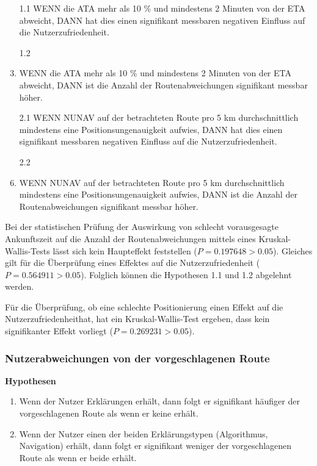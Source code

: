 \begin{enumerate}
    \item[1.1] WENN die ATA mehr als 10 \% und mindestens 2 Minuten von der ETA abweicht, DANN hat dies einen signifikant messbaren negativen Einfluss auf die Nutzerzufriedenheit.
    \item[1.2] \item WENN die ATA mehr als 10 \% und mindestens 2 Minuten von der ETA abweicht, DANN ist die Anzahl der Routenabweichungen signifikant messbar höher.
    \item[2.1] WENN NUNAV auf der betrachteten Route pro 5 km durchschnittlich mindestens eine Positionsungenauigkeit aufwies, DANN hat dies einen signifikant messbaren negativen Einfluss auf die Nutzerzufriedenheit.
    \item[2.2] \item WENN NUNAV auf der betrachteten Route pro 5 km durchschnittlich mindestens eine Positionsungenauigkeit aufwies, DANN ist die Anzahl der Routenabweichungen signifikant messbar höher.
\end{enumerate}

Bei der statistischen Prüfung der Auswirkung von schlecht vorausgesagte Ankunftszeit auf die Anzahl der Routenabweichungen mittels eines Kruskal-Wallis-Tests lässt sich kein Haupteffekt feststellen ($ P = 0.197648 > 0.05 $). Gleiches gilt für die Überprüfung eines Effektes auf die Nutzerzufriedenheit ($ P = 0.564911 > 0.05 $). Folglich können die Hypothesen 1.1 und 1.2 abgelehnt werden.

Für die Überprüfung, ob eine schlechte Positionierung einen Effekt auf die Nutzerzufriedenheithat, hat ein Kruskal-Wallis-Test ergeben, dass kein signifikanter Effekt vorliegt ($ P = 0.269231 > 0.05 $).

\subsubsection{Nutzerabweichungen von der vorgeschlagenen Route}

\textbf{Hypothesen}

\begin{enumerate}
    \item Wenn der Nutzer Erklärungen erhält, dann folgt er signifikant häufiger der vorgeschlagenen Route als wenn er keine erhält.
    \item Wenn der Nutzer einen der beiden Erklärungstypen (Algorithmus, Navigation) erhält, dann folgt er signifikant weniger der vorgeschlagenen Route als wenn er beide erhält.
\end{enumerate}

